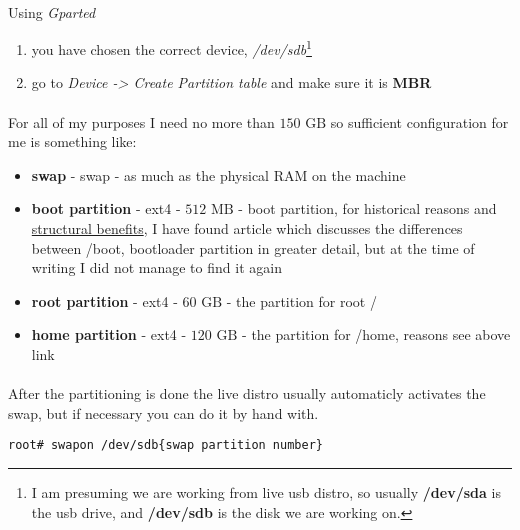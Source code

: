 \documentclass[10pt,a4paper]{article}
\begin{document}
                \paragraph{} Using \textit{Gparted}\begin{enumerate}
                    \item you have chosen the correct device, \textit{/dev/sdb}\footnote{ I am presuming we are working from live usb distro, so usually \textbf{/dev/sda} is the usb drive, and \textbf{/dev/sdb} is the disk we are working on.}
                    \item go to \textit{Device -> Create Partition table} and make sure it is \textbf{MBR}
                \end{enumerate}
                
                \paragraph{} For all of my purposes I need no more than $ 150 \mbox{ GB}$ so sufficient configuration for me is something like: \begin{itemize}
                    \item \textbf{swap} - swap - as much as the physical RAM on the machine 
                    \item \textbf{boot partition} - ext4 - $ 512 \mbox{ MB} $  - boot partition, for historical reasons and \href{https://superuser.com/questions/522971/is-a-boot-partition-always-necessary}{structural benefits}, I have found article which discusses the differences between /boot, bootloader partition in greater detail, but at the time of writing I did not manage to find it again
                    \item \textbf{root partition} - ext4 - $ 60 \mbox{ GB} $ - the partition for root /
                    \item \textbf{home partition} - ext4 - $ 120 \mbox{ GB} $ - the partition for /home, reasons see above link
                \end{itemize}
            
                \paragraph{} After the partitioning is done the live distro usually automaticly activates the swap, but if necessary you can do it by hand with.

\begin{lstlisting}[style=BashInputRoot]
root# swapon /dev/sdb{swap partition number}
\end{lstlisting}
\end{document}
